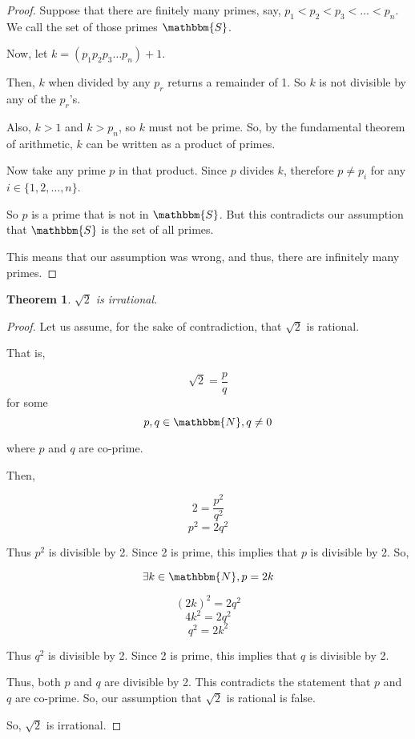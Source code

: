 \documentclass[14pt]{extarticle}
\newcommand{\N}{\mathbbm{N}}
\newcommand{\Sset}{\mathbbm{S}}
\newtheorem{theorem}{Theorem}
\begin{document}
\begin{proof}
    Suppose that there are finitely many primes, say, $p_1 < p_2 < p_3 < \dots < p_n$. We call the set of those primes $\Sset$.

    Now, let $k = (p_1p_2p_3\dots p_n) +1$.

    Then, $k$ when divided by any $p_r$ returns a remainder of 1. So $k$ is not divisible by any of the $p_r$'s.

    Also, $k > 1$ and $k > p_n$, so $k$ must not be prime. So, by the fundamental theorem of arithmetic, $k$ can be written as a product of primes.

    Now take any prime $p$ in that product. Since $p$ divides $k$, therefore $p \neq p_i$ for any $i \in \{1, 2, \dots, n\}$.

    So $p$ is a prime that is not in $\Sset$. But this contradicts our assumption that $\Sset$ is the set of all primes. 
    
    This means that our assumption was wrong, and thus, there are infinitely many primes.
\end{proof}

\newpage

\begin{theorem}
    $\sqrt{2}$ is irrational.
\end{theorem}

\begin{proof}
    Let us assume, for the sake of contradiction, that $\sqrt{2}$ is rational.

    That is,

    \[ \sqrt{2} = \frac{p}{q} \] for some \[ p, q \in \N, q\neq 0 \]

    where $p$ and $q$ are co-prime.

    Then,

    \[ 2 = \frac{p^2}{q^2} \]
    \[p^2 = 2q^2\]

    Thus $p^2$ is divisible by 2. Since 2 is prime, this implies that $p$ is divisible by 2. So,

    \[\exists k \in \N, p = 2k\]

    \[(2k)^2 = 2q^2\]
    \[4k^2 = 2q^2\]
    \[q^2 = 2k^2\]

    Thus $q^2$ is divisible by 2. Since 2 is prime, this implies that $q$ is divisible by 2.

    Thus, both $p$ and $q$ are divisible by 2. This contradicts the statement that $p$ and $q$ are co-prime. So, our assumption that $\sqrt{2}$ is rational is false.

    So, $\sqrt{2}$ is irrational.
\end{proof}
\end{document}
